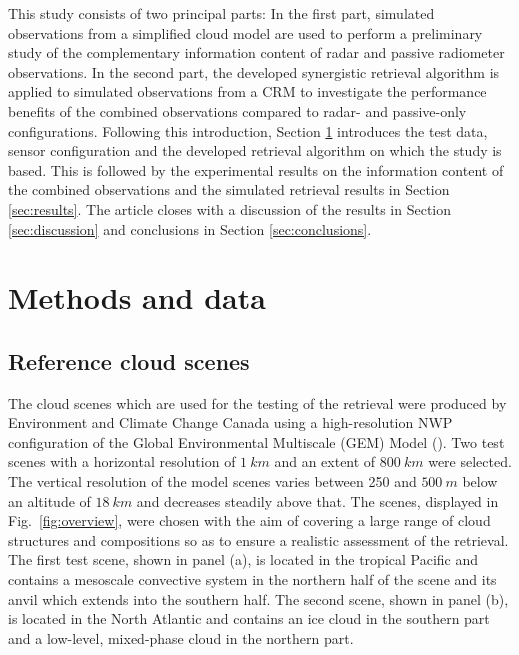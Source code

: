 \documentclass[journal abbreviation, manuscript]{copernicus}
\begin{document}
This study consists of two principal parts: In the first part, simulated
observations from a simplified cloud model are used to perform a preliminary
study of the complementary information content of radar and passive radiometer
observations. In the second part, the developed synergistic retrieval algorithm
is applied to simulated observations from a CRM to investigate the performance
benefits of the combined observations compared to radar- and passive-only
configurations. Following this introduction, Section \ref{sec:methods_and_data}
introduces the test data, sensor configuration and the developed retrieval
algorithm on which the study is based. This is followed by the experimental
results on the information content of the combined observations and the
simulated retrieval results in Section \ref{sec:results}. The article closes
with a discussion of the results in Section \ref{sec:discussion} and conclusions
in Section \ref{sec:conclusions}.


\section{Methods and data}
\label{sec:methods_and_data}

\subsection{Reference cloud scenes}

The cloud scenes which are used for the testing of the retrieval were produced
by Environment and Climate Change Canada using a high-resolution NWP
configuration of the Global Environmental Multiscale (GEM) Model
(\cite{cote98}). Two test scenes with a horizontal resolution of $1\ \unit{km}$
and an extent of $800\ \unit{km}$ were selected. The vertical resolution of the
model scenes varies between 250 and $500\ \unit{m}$ below an altitude of
$18\ \unit{km}$ and decreases steadily above that. The scenes, displayed in
Fig.~\ref{fig:overview}, were chosen with the aim of covering a large range of
cloud structures and compositions so as to ensure a realistic assessment of the
retrieval. The first test scene, shown in panel (a), is located in the tropical
Pacific and contains a mesoscale convective system in the northern half of the scene
and its anvil which extends into the southern half. The second scene, shown in
panel (b), is located in the North Atlantic and contains an ice cloud in the
southern part and a low-level, mixed-phase cloud in the northern part.
\end{document}
